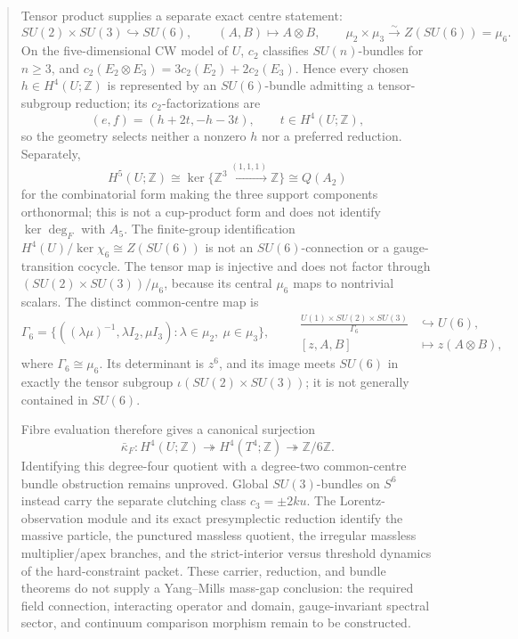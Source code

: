 \documentclass[11pt,letterpaper]{article}
\theoremstyle{definition}
\theoremstyle{remark}
\begin{document}
\begin{abstract}
 Tensor product supplies a separate exact centre statement:
 \[
  SU(2)\times SU(3)\hookrightarrow SU(6),\qquad
  (A,B)\longmapsto A\otimes B,\qquad
  \mu_2\times\mu_3\xrightarrow{\sim}Z(SU(6))=\mu_6.
 \]
 On the five-dimensional CW model of \(U\), \(c_2\) classifies
 \(SU(n)\)-bundles for \(n\ge3\), and
 \(c_2(E_2\otimes E_3)=3c_2(E_2)+2c_2(E_3)\).  Hence every chosen
 \(h\in H^4(U;\mathbb Z)\) is represented by an \(SU(6)\)-bundle admitting
 a tensor-subgroup reduction; its \(c_2\)-factorizations are
 \[
 (e,f)=(h+2t,-h-3t),\qquad t\in H^4(U;\mathbb Z),
 \]
 so the geometry selects neither a nonzero \(h\) nor a preferred reduction.
 Separately,
 \[
  H^5(U;\mathbb Z)
  \cong\ker\{\mathbb Z^3\xrightarrow{(1,1,1)}\mathbb Z\}
  \cong Q(A_2)
 \]
 for the combinatorial form making the three support components
 orthonormal; this is not a cup-product form and does not identify
 \(\ker\deg_F\) with \(A_5\).
 The finite-group identification
 \(H^4(U)/\ker\chi_6\cong Z(SU(6))\) is not an \(SU(6)\)-connection or a
 gauge-transition cocycle.  The tensor map is injective and does not factor
 through \((SU(2)\times SU(3))/\mu_6\), because its central \(\mu_6\) maps
 to nontrivial scalars.  The distinct common-centre map is
 \[
  \Gamma_6=\{((\lambda\mu)^{-1},\lambda I_2,\mu I_3):
              \lambda\in\mu_2,\ \mu\in\mu_3\},
  \qquad
  \begin{aligned}
  \frac{U(1)\times SU(2)\times SU(3)}{\Gamma_6}
  &\hookrightarrow U(6),\\
  [z,A,B]&\longmapsto z(A\otimes B),
  \end{aligned}
 \]
 where \(\Gamma_6\cong\mu_6\).  Its determinant is \(z^6\), and its image
 meets \(SU(6)\) in exactly the tensor subgroup
 \(\iota(SU(2)\times SU(3))\); it is not generally contained in
 \(SU(6)\).

 Fibre evaluation therefore gives a canonical surjection
 \[
  \bar\kappa_F:H^4(U;\mathbb Z)\twoheadrightarrow
  H^4(T^4;\mathbb Z)\twoheadrightarrow\mathbb Z/6\mathbb Z.
 \]
 Identifying this degree-four quotient with a degree-two common-centre bundle
 obstruction remains unproved.  Global \(SU(3)\)-bundles on \(S^6\) instead carry the separate
 clutching class \(c_3=\pm2k u\).  The Lorentz-observation module and its
 exact presymplectic reduction identify the massive particle, the punctured
 massless quotient, the irregular massless multiplier/apex branches, and the
 strict-interior versus threshold dynamics of the hard-constraint packet.
 These carrier, reduction, and bundle theorems do not supply a Yang--Mills
 mass-gap conclusion: the required field connection,
 interacting operator and domain, gauge-invariant spectral sector, and
 continuum comparison morphism remain to be constructed.


\end{abstract}
\end{document}

